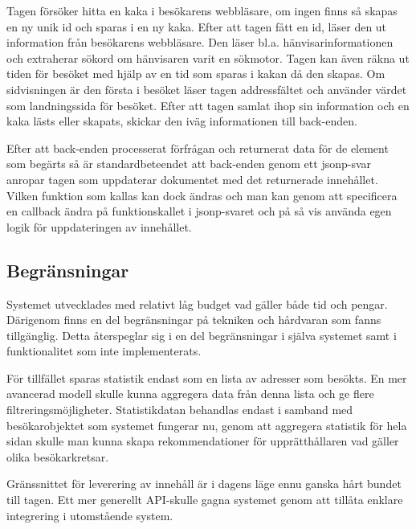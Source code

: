 Tagen försöker hitta en kaka i besökarens webbläsare, om ingen finns så skapas en ny unik id och sparas i en ny kaka. Efter att tagen fått en id, läser den ut information från besökarens webbläsare. Den läser bl.a. hänvisarinformationen och extraherar sökord om hänvisaren varit en sökmotor. Tagen kan även räkna ut tiden för besöket med hjälp av en tid som sparas i kakan då den skapas. Om sidvisningen är den första i besöket läser tagen addressfältet och använder värdet som landningssida för besöket. Efter att tagen samlat ihop sin information och en kaka lästs eller skapats, skickar den iväg informationen till back-enden.

Efter att back-enden processerat förfrågan och returnerat data för de element som begärts så är standardbeteendet att back-enden genom ett \gls{jsonp}-svar anropar tagen som uppdaterar dokumentet med det returnerade innehållet. Vilken funktion som kallas kan dock ändras och man kan genom att specificera en callback ändra på funktionskallet i \gls{jsonp}-svaret och på så vis använda egen logik för uppdateringen av innehållet.

\subsection{Begränsningar}

Systemet utvecklades med relativt låg budget vad gäller både tid och pengar. Därigenom finns en del begränsningar på tekniken och hårdvaran som fanns tillgänglig. Detta återspeglar sig i en del begränsningar i själva systemet samt i funktionalitet som inte implementerats.

För tillfället sparas statistik endast som en lista av adresser som besökts. En mer avancerad modell skulle kunna aggregera data från denna lista och ge flere filtreringsmöjligheter. Statistikdatan behandlas endast i samband med besökarobjektet som systemet fungerar nu, genom att aggregera statistik för hela sidan skulle man kunna skapa rekommendationer för upprätthållaren vad gäller olika besökarkretsar.

Gränssnittet för leverering av innehåll är i dagens läge ennu ganska hårt bundet till tagen. Ett mer generellt API-skulle gagna systemet genom att tillåta enklare integrering i utomstående system.

